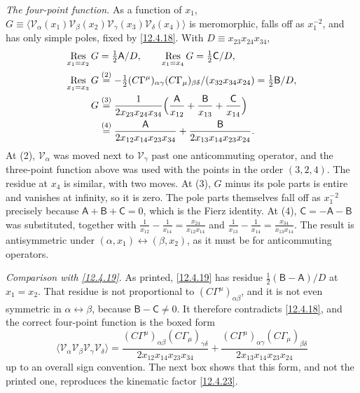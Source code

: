 \begin{tcolorbox}[breakable]
\begin{remark}
		\emph{The four-point function.} As a function of $x_{1}$, $G\equiv\langle\mathcal V_{\alpha}(x_{1})\mathcal V_{\beta}(x_{2})\mathcal V_{\gamma}(x_{3})\mathcal V_{\delta}(x_{4})\rangle$ is meromorphic, falls off as $x_{1}^{-2}$, and has only simple poles, fixed by \eqref{12.4.18}. With $D\equiv x_{23}x_{24}x_{34}$,
		\begin{align*}
			\operatorname*{Res}_{x_{1}=x_{2}}G&=\tfrac{1}{2}\mathsf A/D ,\qquad
			\operatorname*{Res}_{x_{1}=x_{4}}G=\tfrac12\mathsf C/D ,\\
			\operatorname*{Res}_{x_{1}=x_{3}}G&\overset{(2)}{=} -\tfrac12(C\Gamma^{\mu})_{\alpha\gamma}(C\Gamma_{\mu})_{\beta\delta}/(x_{32}x_{34}x_{24})=\tfrac12\mathsf B/D ,\\
			G&\overset{(3)}{=} \frac{1}{2x_{23}x_{24}x_{34}}\Bigl(\frac{\mathsf A}{x_{12}}+\frac{\mathsf B}{x_{13}}+\frac{\mathsf C}{x_{14}}\Bigr)\\
			&\overset{(4)}{=} \frac{\mathsf A}{2x_{12}x_{14}x_{23}x_{34}}+\frac{\mathsf B}{2x_{13}x_{14}x_{23}x_{24}} .
		\end{align*}
		At (2), $\mathcal V_{\alpha}$ was moved next to $\mathcal V_{\gamma}$ past one anticommuting operator, and the three-point function above was used with the points in the order $(3,2,4)$. The residue at $x_{4}$ is similar, with two moves. At (3), $G$ minus its pole parts is entire and vanishes at infinity, so it is zero. The pole parts themselves fall off as $x_{1}^{-2}$ precisely because $\mathsf A+\mathsf B+\mathsf C=0$, which is the Fierz identity. At (4), $\mathsf C=-\mathsf A-\mathsf B$ was substituted, together with $\frac1{x_{12}}-\frac1{x_{14}}=\frac{x_{24}}{x_{12}x_{14}}$ and $\frac1{x_{13}}-\frac1{x_{14}}=\frac{x_{34}}{x_{13}x_{14}}$. The result is antisymmetric under $(\alpha,x_{1})\leftrightarrow(\beta,x_{2})$, as it must be for anticommuting operators.

		\emph{Comparison with \eqref{12.4.19}.} As printed, \eqref{12.4.19} has residue $\frac12(\mathsf B-\mathsf A)/D$ at $x_{1}=x_{2}$. That residue is not proportional to $(C\Gamma^{\mu})_{\alpha\beta}$, and it is not even symmetric in $\alpha\leftrightarrow\beta$, because $\mathsf B-\mathsf C\neq0$. It therefore contradicts \eqref{12.4.18}, and the correct four-point function is the boxed form
		\[
		\boxed{\;\langle\mathcal V_{\alpha}\mathcal V_{\beta}\mathcal V_{\gamma}\mathcal V_{\delta}\rangle=\frac{(C\Gamma^{\mu})_{\alpha\beta}(C\Gamma_{\mu})_{\gamma\delta}}{2x_{12}x_{14}x_{23}x_{34}}+\frac{(C\Gamma^{\mu})_{\alpha\gamma}(C\Gamma_{\mu})_{\beta\delta}}{2x_{13}x_{14}x_{23}x_{24}}\;}
		\]
		up to an overall sign convention. The next box shows that this form, and not the printed one, reproduces the kinematic factor \eqref{12.4.23}.
	\end{remark}
\end{tcolorbox}
